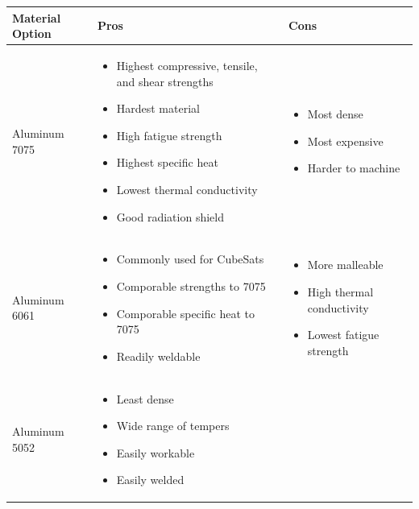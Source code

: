 \begin{table}[H]
\centering
\begin{tabular}{|p{}|p{}|p{}|} 
\hline
\textbf{Material Option} & \textbf{Pros} & \textbf{Cons}
\\
\hline
     Aluminum 7075
     &
    \begin{itemize}
        \item Highest compressive, tensile, and shear strengths
        \item Hardest material
        \item High fatigue strength
        \item Highest specific heat
        \item Lowest thermal conductivity
        \item Good radiation shield
    \end{itemize}
    &
    \begin{itemize}
        \item Most dense
        \item Most expensive
        \item Harder to machine
    \end{itemize}
    \\
\hline
     Aluminum 6061
     &
    \begin{itemize}
        \item Commonly used for CubeSats
        \item Comporable strengths to 7075
        \item Comporable specific heat to 7075
        \item Readily weldable
    \end{itemize}
    &
        \begin{itemize}
        \item More malleable
        \item High thermal conductivity
        \item Lowest fatigue strength
    \end{itemize}
    \\
\hline
    Aluminum 5052
    &
    \begin{itemize}
        \item Least dense
        \item Wide range of tempers
        \item Easily workable
        \item Easily welded
    \end{itemize}

\end{tabular}
\end{table}
